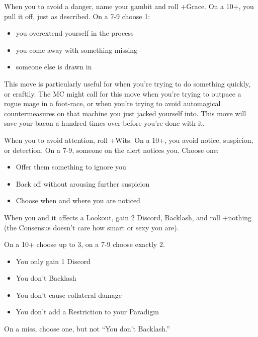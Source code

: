 \begin{multicols}{3}
  \begin{move}
    When you  to avoid a
    danger, name your gambit and roll +Grace. On a 10+, you pull it
    off, just as described. On a 7-9 choose 1:
    \begin{itemize}
      \setlength\itemsep{0em}
      \item you overextend yourself in the process
      \item you come away with something missing
      \item someone else is drawn in
    \end{itemize}
\begin{movedetail}
  This move is particularly useful for when you're trying to do
  something quickly, or craftily. The MC might call for this move when
  you're trying to outpace a rogue mage in a foot-race, or when you're
  trying to avoid automagical countermeasures on that machine you just
  jacked yourself into. This move will save your bacon a hundred times
  over before you're done with it.
\end{movedetail}
  \end{move}

  \SEPARATOR

  \begin{move}
    When you  to avoid attention, roll
    +Wits. On a 10+, you avoid notice, suspicion, or detection. On a
    7-9, someone on the alert notices you. Choose one:
    \begin{itemize}
      \setlength\itemsep{0em}
    \item Offer them something to ignore you
    \item Back off without arousing further suspicion
    \item Choose when and where you are noticed
    \end{itemize}
  \end{move}

  \SEPARATOR

  \begin{move}
    When you  and it affects a Lookout, gain
    2 Discord, Backlash, and roll +nothing (the Consensus doesn't care
    how smart or sexy you are).

    On a 10+ choose up to 3, on a 7-9 choose exactly 2.
    \begin{itemize}
      \setlength\itemsep{0em}
    \item You only gain 1 Discord
    \item You don't Backlash
    \item You don't cause collateral damage
    \item You don't add a Restriction to your Paradigm
    \end{itemize}
    On a miss, choose one, but not ``You don't Backlash.''
  \end{move}


\end{multicols}
